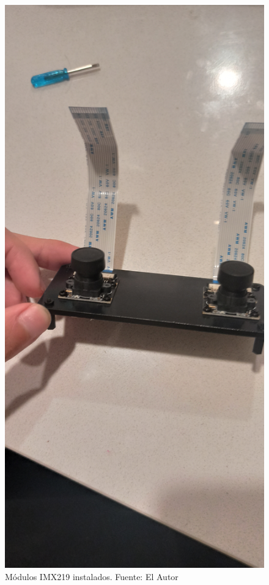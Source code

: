 \begin{enumerate}
\begin{figure}[H]
        \includegraphics[scale=0.05]{Recursos/camera_installed.jpg}
        \caption[Módulos IMX219 instalados.]{Módulos IMX219 instalados. {\footnotesize Fuente: El Autor}}
        \label{cameras_installed}
    \end{figure}

\end{enumerate}
